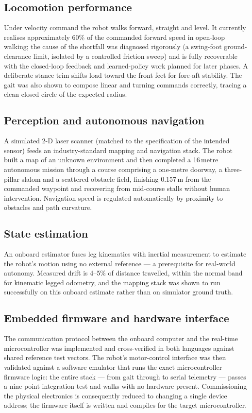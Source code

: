 \documentclass[11pt,a4paper]{article}
\begin{document}
\subsection{Locomotion performance}
Under velocity command the robot walks forward, straight and level. It currently realises
approximately 60\% of the commanded forward speed in open-loop walking; the cause of the shortfall
was diagnosed rigorously (a swing-foot ground-clearance limit, isolated by a controlled friction
sweep) and is fully recoverable with the closed-loop feedback and learned-policy work planned for
later phases. A deliberate stance trim shifts load toward the front feet for fore-aft stability.
The gait was also shown to compose linear and turning commands correctly, tracing a clean closed
circle of the expected radius.

\subsection{Perception and autonomous navigation}
A simulated 2-D laser scanner (matched to the specification of the intended sensor) feeds an
industry-standard mapping and navigation stack. The robot built a map of an unknown environment and
then completed a 16\,metre autonomous mission through a course comprising a one-metre doorway, a
three-pillar slalom and a scattered-obstacle field, finishing 0.157\,m from the commanded waypoint
and recovering from mid-course stalls without human intervention. Navigation speed is regulated
automatically by proximity to obstacles and path curvature.

\subsection{State estimation}
An onboard estimator fuses leg kinematics with inertial measurement to estimate the robot's motion
using no external reference --- a prerequisite for real-world autonomy. Measured drift is
4--5\% of distance travelled, within the normal band for kinematic legged odometry, and the mapping
stack was shown to run successfully on this onboard estimate rather than on simulator ground truth.

\subsection{Embedded firmware and hardware interface}
The communication protocol between the onboard computer and the real-time microcontroller was
implemented and cross-verified in both languages against shared reference test vectors. The robot's
motor-control interface was then validated against a software emulator that runs the exact
microcontroller firmware logic: the entire stack --- from gait through to serial telemetry --- passes
a nine-point integration test and walks with no hardware present. Commissioning the physical
electronics is consequently reduced to changing a single device address; the firmware itself is
written and compiles for the target microcontroller.
\end{document}
